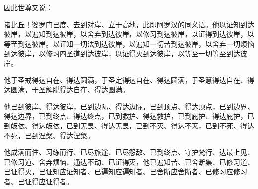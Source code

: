 因此世尊又说：


\begin{quoting}诸比丘！婆罗门已度、去到对岸、立于高地，此即阿罗汉的同义语。他以证知到达彼岸，以遍知到达彼岸，以舍弃到达彼岸，以修习到达彼岸，以证得到达彼岸，以等至到达彼岸。以证知一切法到达彼岸，以遍知一切苦到达彼岸，以舍弃一切烦恼到达彼岸，以修习四圣道到达彼岸，以证得灭到达彼岸，以等至一切等至到达彼岸。\end{quoting}


\begin{quoting}他于圣戒得达自在、得达圆满，于圣定得达自在、得达圆满，于圣慧得达自在、得达圆满，于圣解脱得达自在、得达圆满。\end{quoting}


\begin{quoting}他已到彼岸、得达彼岸，已到边际、得达边际，已到顶点、得达顶点，已到边界、得达边界，已到终点、得达终点，已到救护、得达救护，已到庇护、得达庇护，已到皈依、得达皈依，已到无畏、得达无畏，已到不灭、得达不灭，已到不死、得达不死，已到涅槃、得达涅槃。\end{quoting}


\begin{quoting}他成满而住、习练而行、已尽旅途、已尽怨敌、已到终点、守护梵行、达最上见、已修习道、舍弃烦恼、通达不动、已证得灭，他已遍知苦、已舍断集、已修习道、已证得灭，已证知应证知者、已遍知应遍知者、已舍断应舍断者、已修习应修习者、已证得应证得者。\end{quoting}

